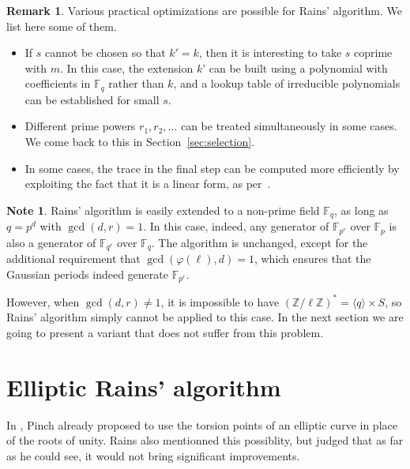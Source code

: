 \documentclass[12pt]{article}
\theoremstyle{plain}
\theoremstyle{definition}
\newtheorem*{remark}{Remark}
\newtheorem{note}[theorem]{Note}
\def\Z{\ensuremath{\mathbb{Z}}}
\def\F{\ensuremath{\mathbb{F}}}
\def\euler{\ensuremath{\varphi}}
\newcounter{algorithm}
\begin{document}
\begin{remark}
  Various practical optimizations are possible for Rains'
  algorithm. We list here some of them.
  \begin{itemize}
  \item If $s$ cannot be chosen so that $k'=k$, then it is interesting
    to take $s$ coprime with $m$. In this case, the extension $k$' can
    be built using a polynomial with coefficients in $\F_q$ rather
    than $k$, and a lookup table of irreducible polynomials can be
    established for small $s$.
  \item Different prime powers $r_1,r_2,\dots$ can be treated
    simultaneously in some cases. We come back to this in
    Section~\ref{sec:selection}.
  \item In some cases, the trace in the final step can be computed
    more efficiently by exploiting the fact that it is a linear form,
    as per~\cite{todo}.
  \end{itemize}
\end{remark}

\begin{note}
  \label{note:rains-non-prime}
  Rains' algorithm is easily extended to a non-prime field $\F_q$, as
  long as $q=p^d$ with $\gcd(d,r)=1$. In this case, indeed, any
  generator of $\F_{p^r}$ over $\F_p$ is also a generator of
  $\F_{q^r}$ over $\F_q$. The algorithm is unchanged, except for the
  additional requirement that $\gcd(\euler(\ell),d)=1$, which ensures
  that the Gaussian periods indeed generate $\F_{p^r}$.

  However, when $\gcd(d,r)\ne 1$, it is impossible to have
  $(\Z/\ell\Z)^\ast=\langle q\rangle\times S$, so Rains' algorithm
  simply cannot be applied to this case. In the next section we are
  going to present a variant that does not suffer from this problem.
\end{note}



\section{Elliptic Rains' algorithm}
\label{sec:rains-elliptic}

In \cite{Pinch}, Pinch already proposed to use the torsion points of an elliptic
curve in place of the roots of unity. Rains also mentionned this possiblity, 
but judged that as far as he could see, it would not bring significant 
improvements.
 
\end{document}
